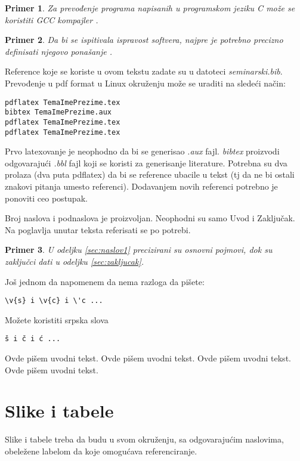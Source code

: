 \documentclass[a4paper]{article}
\newtheorem{primer}{Primer}[section]
\begin{document}
\begin{primer}
Za prevođenje programa napisanih u programskom jeziku C može se koristiti GCC kompajler \cite{gcc}.
\end{primer}

\begin{primer}
 Da bi se ispitivala ispravost softvera, najpre je potrebno precizno definisati njegovo ponašanje \cite{laski2009software}. 
\end{primer}

Reference koje se koriste u ovom tekstu zadate su u datoteci {\em seminarski.bib}. Prevođenje u pdf format u Linux okruženju može se uraditi na sledeći način:
\begin{verbatim}
pdflatex TemaImePrezime.tex 
bibtex TemaImePrezime.aux 
pdflatex TemaImePrezime.tex 
pdflatex TemaImePrezime.tex 
\end{verbatim}
Prvo latexovanje je neophodno da bi se generisao {\em .aux} fajl. {\em bibtex} proizvodi odgovarajući {\em .bbl} fajl koji se koristi za generisanje literature. 
Potrebna su dva prolaza (dva puta pdflatex) da bi se reference ubacile u tekst (tj da ne bi ostali znakovi pitanja umesto referenci). Dodavanjem novih referenci potrebno je ponoviti ceo postupak.  


Broj naslova i podnaslova je proizvoljan. Neophodni su samo Uvod i Zaključak. Na poglavlja unutar teksta referisati se po potrebi. 
\begin{primer}
U odeljku \ref{sec:naslov1} precizirani su osnovni pojmovi, dok su zaključci dati u odeljku \ref{sec:zakljucak}.
\end{primer}

Još jednom da napomenem da nema razloga da pišete:
\begin{verbatim}
\v{s} i \v{c} i \'c ...
\end{verbatim}
Možete koristiti srpska slova
\begin{verbatim}
š i č i ć ... 
\end{verbatim}


Ovde pišem uvodni tekst.
Ovde pišem uvodni tekst. 
Ovde pišem uvodni tekst. 
Ovde pišem uvodni tekst. 


\section{Slike i tabele}
\label{slike_i_tabele}

Slike i tabele treba da budu u svom okruženju, sa odgovarajućim naslovima, obeležene labelom da koje omogućava referenciranje. 
\end{document}
